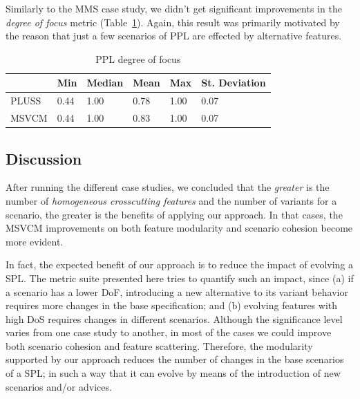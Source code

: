 \documentclass{sig-alt-full}
\begin{document}

Similarly to the MMS case study, we
didn't get significant improvements in the \emph{degree of focus} metric
(Table~\ref{tab:ppl-dof}). Again, this result was primarily motivated by the
reason that just a few scenarios of PPL are effected by alternative features. 

\begin{table}[htb] \centering
\caption{PPL degree of focus}
\label{tab:ppl-dof}
\begin{small}
\begin{tabular}{llllll} \hline
					& Min 	& Median 	& Mean 	& Max 	& St. Deviation \\ \hline
	PLUSS			& 0.44	& 1.00		& 0.78	& 1.00	& 0.07			\\
	MSVCM			& 0.44  & 1.00  	& 0.83 	& 1.00 	& 0.07			\\ \hline	
\end{tabular}
\end{small}
\end{table}

\subsection{Discussion}

After running the different case studies, we concluded that the 
\emph{greater} is the number of \emph{homogeneous crosscutting features} and
the number of variants for a scenario, the greater is the 
benefits of applying our approach. In that cases, the MSVCM improvements on 
both feature modularity and scenario cohesion become more evident. 

In fact, the expected benefit of our approach is to reduce the impact of evolving
a SPL. The metric suite presented here tries to quantify such an impact, since
(a) if a scenario has a lower DoF, introducing a new alternative to its variant
behavior requires more changes in the base specification; and (b) evolving
features with high DoS requires changes in different scenarios. Although the
significance level varies from one case study to another, in most of the cases we
could improve both scenario cohesion and feature scattering. Therefore, the
modularity supported by our approach reduces the number of changes in the base
scenarios of a SPL; in such a way that it can evolve by means of the
introduction of new scenarios and/or advices.
\end{document}
